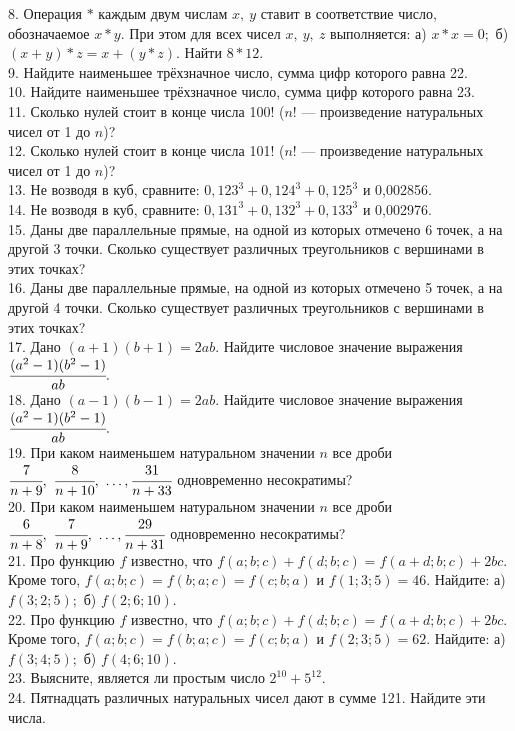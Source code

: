 \documentclass[12pt]{article}
\begin{document}
8. Операция $*$ каждым двум числам $x,\ y$ ставит в соответствие число, обозначаемое $x*y.$ При этом для всех чисел $x,\ y,\ z$ выполняется: а) $x*x=0;$ б) $(x+y)*z=x+(y*z).$ Найти $8*12.$\\
9. Найдите наименьшее трёхзначное число, сумма цифр которого равна 22.\\
10. Найдите наименьшее трёхзначное число, сумма цифр которого равна 23.\\
11. Сколько нулей стоит в конце числа 100! ($n!$ --- произведение натуральных чисел от 1 до $n$)?\\
12. Сколько нулей стоит в конце числа 101! ($n!$ --- произведение натуральных чисел от 1 до $n$)?\\
13. Не возводя в куб, сравните: $0,123^3+0,124^3+0,125^3$ и 0,002856.\\
14. Не возводя в куб, сравните: $0,131^3+0,132^3+0,133^3$ и 0,002976.\\
15. Даны две параллельные прямые, на одной из которых отмечено 6 точек, а на другой 3 точки. Сколько существует различных треугольников с вершинами в этих точках?\\
16. Даны две параллельные прямые, на одной из которых отмечено 5 точек, а на другой 4 точки. Сколько существует различных треугольников с вершинами в этих точках?\\
17. Дано $(a+1)(b+1)=2ab.$ Найдите числовое значение выражения $\cfrac{(a^2-1)(b^2-1)}{ab}.$\\
18. Дано $(a-1)(b-1)=2ab.$ Найдите числовое значение выражения $\cfrac{(a^2-1)(b^2-1)}{ab}.$\\
19. При каком наименьшем натуральном значении $n$ все дроби $\cfrac{7}{n+9},\ \cfrac{8}{n+10},\ \ldots, \cfrac{31}{n+33}$ одновременно несократимы?\\
20. При каком наименьшем натуральном значении $n$ все дроби $\cfrac{6}{n+8},\ \cfrac{7}{n+9},\ \ldots, \cfrac{29}{n+31}$ одновременно несократимы?\\
21. Про функцию $f$ известно, что $f(a;b;c)+f(d;b;c)=f(a+d;b;c)+2bc.$ Кроме того, $f(a;b;c)=f(b;a;c)=f(c;b;a)$ и $f(1;3;5)=46.$ Найдите: а) $f(3;2;5);$
б) $f(2;6;10).$\\
22. Про функцию $f$ известно, что $f(a;b;c)+f(d;b;c)=f(a+d;b;c)+2bc.$ Кроме того, $f(a;b;c)=f(b;a;c)=f(c;b;a)$ и $f(2;3;5)=62.$ Найдите: а) $f(3;4;5);$
б) $f(4;6;10).$\\
23. Выясните, является ли простым число $2^{10}+5^{12}.$\\
24. Пятнадцать различных натуральных чисел дают в сумме 121. Найдите эти числа.\\
\end{document}
